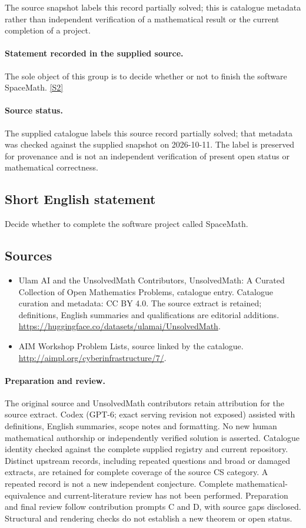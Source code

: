 \documentclass[11pt]{article}
\begin{document}
The source snapshot labels this record partially solved; this is catalogue metadata rather than independent verification of a mathematical result or the current completion of a project.
\paragraph{Statement recorded in the supplied source.}
The sole object of this group is to decide whether or not to finish the software SpaceMath. \href{http://aimpl.org/cyberinfrastructure/7/}{[S2]}
\paragraph{Source status.}
The supplied catalogue labels this source record partially solved; that metadata was checked against the supplied snapshot on 2026-10-11. The label is preserved for provenance and is not an independent verification of present open status or mathematical correctness.
\subsection{Short English statement}
Decide whether to complete the software project called SpaceMath.
\subsection{Sources}
\begin{itemize}
\item[S1] Ulam AI and the UnsolvedMath Contributors, UnsolvedMath: A Curated Collection of Open Mathematics Problems, catalogue entry. Catalogue curation and metadata: CC BY 4.0. The source extract is retained; definitions, English summaries and qualifications are editorial additions.
\url{https://huggingface.co/datasets/ulamai/UnsolvedMath}.
\item[S2] AIM Workshop Problem Lists, source linked by the catalogue.
\url{http://aimpl.org/cyberinfrastructure/7/}.
\end{itemize}
\paragraph{Preparation and review.}
The original source and UnsolvedMath contributors retain attribution for the source extract. Codex (GPT-6; exact serving revision not exposed) assisted with definitions, English summaries, scope notes and formatting. No new human mathematical authorship or independently verified solution is asserted. Catalogue identity checked against the complete supplied registry and current repository. Distinct upstream records, including repeated questions and broad or damaged extracts, are retained for complete coverage of the source CS category. A repeated record is not a new independent conjecture. Complete mathematical-equivalence and current-literature review has not been performed. Preparation and final review follow contribution prompts C and D, with source gaps disclosed. Structural and rendering checks do not establish a new theorem or open status.
\label{end:statement}
\end{document}
